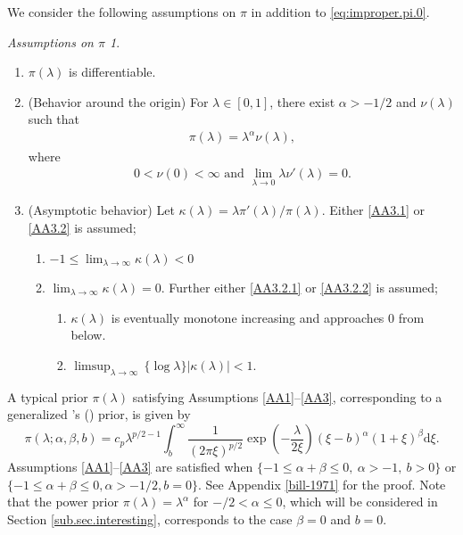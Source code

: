 \documentclass[preprint,11pt]{imsart}
\numberwithin{equation}{section}
\theoremstyle{plain}
\theoremstyle{definition}
\theoremstyle{remark}
\newtheorem*{assumptionpi}{Assumptions on $\pi$}%
\def\citeapos#1{\citeauthor{#1}'s (\citeyear{#1})}
\newcommand{\rd}{\mathrm{d}}
\newcommand{\dps}{\displaystyle}
\begin{document}
We consider the following assumptions on $\pi$ in addition to \eqref{eq:improper.pi.0}.
\begin{assumptionpi}\mbox{}%
 \begin{enumerate}[label= A.\arabic*]
  \item \label{AA1}$\pi(\lambda)$ is differentiable.
  \item \label{AA2} (Behavior around the origin) 
For $\lambda\in[0,1]$, there exist $\alpha>-1/2$ and $\nu(\lambda)$ 
such that
\begin{align*}
\pi(\lambda)=\lambda^{\alpha}\nu(\lambda), 
\end{align*}
where
\begin{align*}
0<\nu(0)<\infty\text{ and }\lim_{\lambda\to 0} \lambda\nu'(\lambda)=0.
\end{align*}
  \item \label{AA3} (Asymptotic behavior)
       Let
$ \kappa(\lambda)=\lambda\pi'(\lambda)/\pi(\lambda)$.
Either \ref{AA3.1} or \ref{AA3.2} is assumed;
\begin{enumerate}[label= A.3.\arabic*]
 \item \label{AA3.1} $\dps -1\leq \lim_{\lambda\to\infty}\kappa(\lambda)< 0$
 \item \label{AA3.2}$\dps\lim_{\lambda\to\infty}\kappa(\lambda)= 0$.
       Further either \ref{AA3.2.1} or \ref{AA3.2.2} is assumed;
\begin{enumerate}[label= A.3.2.\arabic*]
 \item \label{AA3.2.1}$\kappa(\lambda)$ is eventually monotone increasing and approaches $0$ from below.
\item \label{AA3.2.2}$ \dps\limsup_{\lambda\to\infty}\,\{\log \lambda\}|\kappa(\lambda)|<1$.
\end{enumerate}
\end{enumerate}
	\end{enumerate}
\end{assumptionpi}
A typical prior $\pi(\lambda)$ satisfying Assumptions \ref{AA1}--\ref{AA3}, 
corresponding to a generalized \citeapos{Strawderman-1971} prior, is given by
 \begin{equation}\label{billsprior}
  \pi(\lambda;\alpha,\beta,b)=c_p\lambda^{p/2-1}
   \int_b^\infty\frac{1}{(2\pi\xi)^{p/2}}\exp\left(-\frac{\lambda}{2\xi}\right)
  (\xi-b)^\alpha(1+\xi)^\beta\rd \xi.
 \end{equation}  
Assumptions \ref{AA1}--\ref{AA3} are satisfied when
$ \{-1\leq \alpha+\beta\leq 0, \ \alpha>-1, \ b>0\}$ or
$\{-1\leq \alpha+\beta\leq 0, \alpha>-1/2,  b=0\}$.
See Appendix \ref{bill-1971} for the proof.
Note that the power prior $ \pi(\lambda)=\lambda^{\alpha}$ for $-/2<\alpha \leq 0$,
which will be considered in Section \ref{sub.sec.interesting},
corresponds to the case $\beta=0$ and $b=0$.
\end{document}
